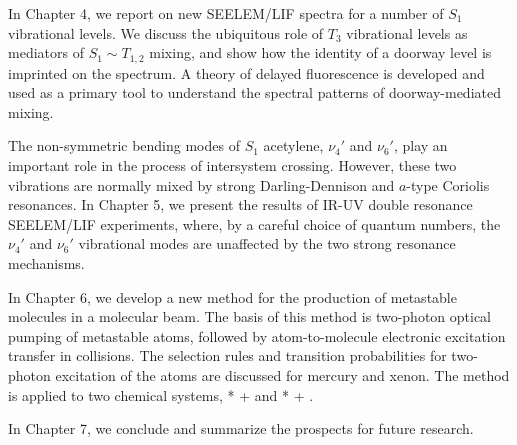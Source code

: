 In Chapter 4, we report on new SEELEM/LIF spectra for a number of
$S_1$ vibrational levels. We discuss the ubiquitous role of $T_3$
vibrational levels as mediators of $S_1 \sim T_{1,2}$ mixing, and show
how the identity of a doorway level is imprinted on the spectrum.  A
theory of delayed fluorescence is developed and used as a primary tool
to understand the spectral patterns of doorway-mediated mixing.



The non-symmetric bending modes of $S_1$ acetylene, $\nu_4'$ and
$\nu_6'$, play an important role in the process of intersystem
crossing.  However, these two vibrations are normally mixed by strong
Darling-Dennison and $a$-type Coriolis resonances.  In Chapter 5, we
present the results of IR-UV double resonance SEELEM/LIF experiments,
where, by a careful choice of quantum numbers, the $\nu_4'$ and
$\nu_6'$ vibrational modes are unaffected by the two strong resonance
mechanisms.

In Chapter 6, we develop a new method for the production of metastable
molecules in a molecular beam.  The basis of this method is two-photon
optical pumping of metastable atoms, followed by atom-to-molecule
electronic excitation transfer in collisions.  The selection rules and
transition probabilities for two-photon excitation of the atoms are
discussed for mercury and xenon.  The method is applied to two
chemical systems, * +  and * + .


In Chapter 7, we conclude and summarize the prospects for future
research.

% 
% 
% 
